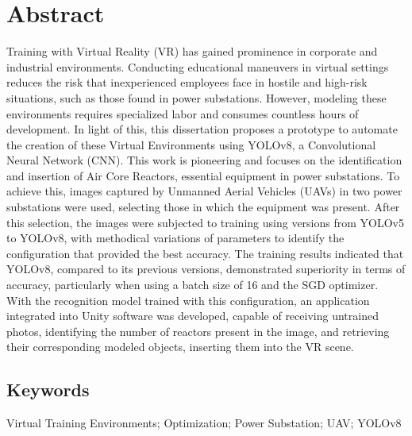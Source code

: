 \newpage
\thispagestyle{empty}
\chapter*{Abstract}
\vspace{-35pt}

Training with Virtual Reality (VR) has gained prominence in corporate and industrial environments. Conducting educational maneuvers in virtual settings reduces the risk that inexperienced employees face in hostile and high-risk situations, such as those found in power substations. However, modeling these environments requires specialized labor and consumes countless hours of development. In light of this, this dissertation proposes a prototype to automate the creation of these Virtual Environments using YOLOv8, a Convolutional Neural Network (CNN). This work is pioneering and focuses on the identification and insertion of Air Core Reactors, essential equipment in power substations. To achieve this, images captured by Unmanned Aerial Vehicles (UAVs) in two power substations were used, selecting those in which the equipment was present. After this selection, the images were subjected to training using versions from YOLOv5 to YOLOv8, with methodical variations of parameters to identify the configuration that provided the best accuracy. The training results indicated that YOLOv8, compared to its previous versions, demonstrated superiority in terms of accuracy, particularly when using a batch size of 16 and the SGD optimizer. With the recognition model trained with this configuration, an application integrated into Unity software was developed, capable of receiving untrained photos, identifying the number of reactors present in the image, and retrieving their corresponding modeled objects, inserting them into the VR scene.

\section*{Keywords}
Virtual Training Environments; Optimization; Power Substation; UAV; YOLOv8